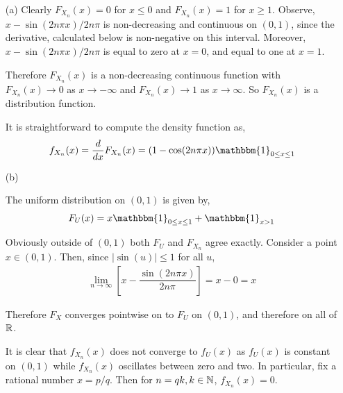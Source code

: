 \begin{solution}[Solution]
\begin{enumerate}
    \item[(a)] Clearly \( F_{X_n}(x) = 0 \) for \( x\leq 0 \) and \( F_{X_n}(x) = 1 \) for \( x\geq 1 \). 
        Observe, \( x-\sin(2n\pi x)/2n\pi \) is non-decreasing and continuous on \( (0,1) \), since the derivative, calculated below is non-negative on this interval. Moreover, \( x-\sin(2n\pi x)/2n\pi \) is equal to zero at \( x=0 \), and equal to one at \( x=1 \).
        
        Therefore \( F_{X_n}(x) \) is a non-decreasing continuous function with \( F_{X_n}(x)\to 0 \) as \( x\to-\infty \) and \( F_{X_n}(x)\to 1 \) as \( x\to\infty \). So \( F_{X_n}(x) \) is a distribution function.
        
        It is straightforward to compute the density function as,
        \begin{align*}
            f_{X_n}(x) = \dfrac{d}{dx}F_{X_n}(x) = (1-\cos(2n\pi x))\mathbbm{1}_{0\leq x\leq 1}
        \end{align*}
    \item[(b)]

        The uniform distribution on \( (0,1) \) is given by,
        \begin{align*}
            F_U(x) = x\mathbbm{1}_{0\leq x\leq 1}+\mathbbm{1}_{x>1}
        \end{align*}

        Obviously outside of \( (0,1) \) both \( F_U \) and \( F_{X_n} \) agree exactly. Consider a point \( x\in(0,1) \). Then, since \( |\sin(u)|\leq 1 \) for all \( u \),
        \begin{align*}
            \lim_{n\to\infty}\left[ x-\dfrac{\sin(2n \pi x)}{2n\pi}\right] = x-0 = x%
        \end{align*}

        Therefore \( F_X \) converges pointwise on to \( F_U \) on \( (0,1) \), and therefore on all of \( \mathbb{R} \).

        It is clear that \( f_{X_n}(x) \) does not converge to \( f_U(x) \) as \( f_U(x) \) is constant on \( (0,1) \) while \( f_{X_n}(x) \) oscillates between zero and two. In particular, fix a rational number \( x=p/q \). Then for \( n=qk, k\in\mathbb{N} \), \( f_{X_n}(x)=0 \). %


\end{enumerate}
\end{solution}
